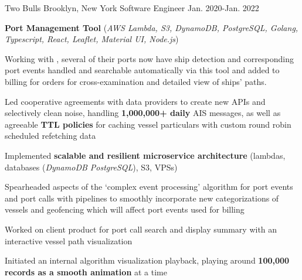 \begin{cventries}
  \nrolecventrynoitems
    {Two Bulls} %
    {Brooklyn, New York} %
    {Software Engineer} %
    {Jan. 2020-Jan. 2022} %
    {} %
    {} %
    {} %
    {} %

  \cvcustombodydescription
      {\textbf{Port Management Tool} (\emph{AWS Lambda, S3, DynamoDB, PostgreSQL, Golang, Typescript, React, Leaflet, Material UI, Node.js})}
      {
      \begin{cvtightprose} %
        {Working with , several of their ports now have ship detection and corresponding port events handled and searchable automatically via this tool and added to billing for  orders for cross-examination and detailed view of ships' paths.}
      \end{cvtightprose}
      }
      {
      \begin{cvitems} %
        \item {Led cooperative agreements with data providers to create new APIs and selectively clean noise, handling \textbf{1,000,000+ daily} AIS messages, as well as agreeable \textbf{TTL policies} for caching vessel particulars with custom round robin scheduled refetching data}
        \item {Implemented \textbf{scalable and resilient microservice architecture} (lambdas, databases (\emph{DynamoDB \rightarrow PostgreSQL}), S3, VPSs)}
        \item {Spearheaded aspects of the `complex event processing' algorithm for port events and port calls with pipelines to smoothly incorporate new categorizations of vessels and geofencing which will affect port events used for billing}
        \item {Worked on client product for port call search and display summary with an interactive vessel path visualization}
        \item {Initiated an internal algorithm visualization playback, playing around \textbf{100,000 records as a smooth animation} at a time}
      \end{cvitems}
    }


\end{cventries}

